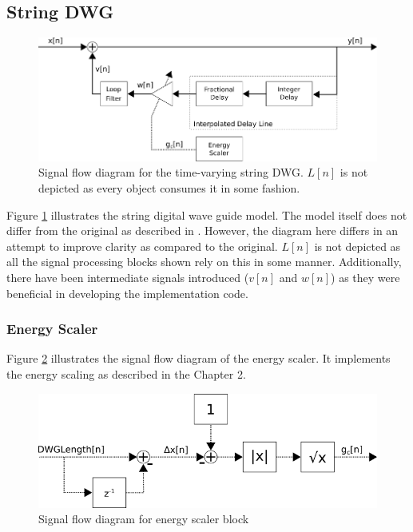 \documentclass[../main.tex]{subfiles}
\begin{document}
\subsection{String DWG}

\begin{figure}[h]
    \centering
    \includegraphics[scale=.5]{./images/diagrams/stringDWG.png}
    \caption{Signal flow diagram for the time-varying string DWG. $L[n]$ is not depicted as every object consumes it in some fashion.}
    \label{fig:stringDWG}
\end{figure}

Figure \ref{fig:stringDWG} illustrates the string digital wave guide model. The model itself does not differ from the original as described in . However, the diagram here differs in an attempt to improve clarity as compared to the original. $L[n]$ is not depicted as all the signal processing blocks shown rely on this in some manner. Additionally, there have been intermediate signals introduced ($v[n]$ and $w[n]$) as they were beneficial in developing the implementation code.

\subsubsection{Energy Scaler}
Figure \ref{fig:energyScaler} illustrates the signal flow diagram of the energy scaler. It implements the energy scaling as described in the Chapter 2.
\begin{figure}[h]
    \centering
    \includegraphics[scale=.5]{./images/diagrams/energyScaler.png}
    \caption{Signal flow diagram for energy scaler block}
    \label{fig:energyScaler}
\end{figure}
\end{document}

